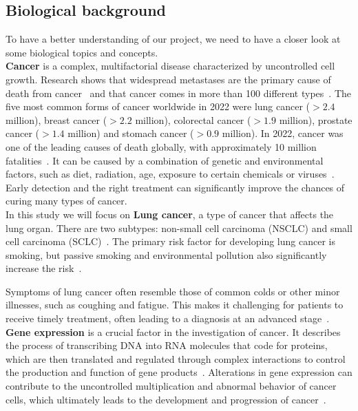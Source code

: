 \subsection{Biological background} \label{subsec:biological_background}
To have a better understanding of our project, we need to have a closer look at some biological topics and concepts.\\

\textbf{Cancer} is a complex, multifactorial disease characterized by uncontrolled cell growth.
Research shows that widespread metastases are the primary cause of death from cancer~\cite{who_cancer_fact_sheet}
and that cancer comes in more than 100 different types~\cite{nci_cancer_types}.
The five most common forms of cancer worldwide in 2022 were lung cancer ($>2.4$ million),
breast cancer ($>2.2$ million), colorectal cancer ($>1.9$ million), prostate cancer ($>1.4$ million) and
stomach cancer ($>0.9$ million).
In 2022, cancer was one of the leading causes of death globally,
with approximately 10 million fatalities~\cite{ferlay2024global}.
It can be caused by a combination of genetic and environmental factors,
such as diet, radiation, age, exposure to certain chemicals or viruses~\cite{nci_cancer_risk}.
Early detection and the right treatment can significantly improve the chances of curing many types of cancer.
\\

In this study we will focus on \textbf{Lung cancer}, a type of cancer that affects the lung organ.
There are two subtypes: non-small cell carcinoma (NSCLC) and small cell carcinoma (SCLC)~\cite{nci_lung_cancer_types}.
The primary risk factor for developing lung cancer is smoking,
but passive smoking and environmental pollution also significantly increase the risk~\cite{nci_lung_cancer_types}.

Symptoms of lung cancer often resemble those of common colds or other minor illnesses, such as coughing and fatigue.
This makes it challenging for patients to receive timely treatment, often leading to a diagnosis at an advanced stage~\cite{who_lung_cancer}.
\\

\textbf{Gene expression} is a crucial factor in the investigation of cancer.
It describes the process of transcribing DNA into RNA molecules that code for proteins,
which are then translated and regulated through complex interactions to control the production
and function of gene products~\cite{nhi_gene_expression}.
Alterations in gene expression can contribute to the uncontrolled multiplication and abnormal behavior of cancer cells,
which ultimately leads to the development and progression of cancer~\cite{ferlier2022regulation}.
\\

